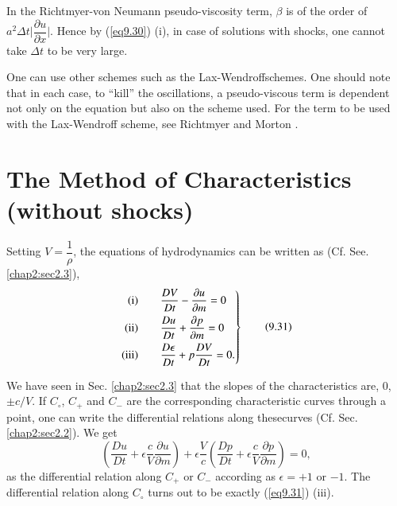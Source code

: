 \begin{remark}\label{chap9:rem9.4}
In the Richtmyer-von Neumann pseudo-viscosity term, $\beta$ is of the order of $a^2 \Delta t \Big|\dfrac{\partial u}{\partial x} \Big|$. Hence by (\ref{eq9.30}) (i), in case of solutions  
with shocks, one cannot take $\Delta t$ to be very large.
\end{remark}

\begin{remark}\label{chap9:rem9.5}
One can use other schemes such as the Lax-Wendroff\break  schemes. One should
note that in each case, to ``kill'' the oscillations, a pseudo-viscous
term is dependent not only on the equation but also on the scheme
used. For the term to be used with the Lax-Wendroff scheme, see
Richtmyer and Morton \cite{key32}.  
\end{remark}


\section{The Method of Characteristics (without
  shocks)}\label{chap9:sec9.7}

Setting $V = \dfrac{1}{\rho}$, the equations of hydrodynamics can be
written as (Cf. See. \ref{chap2:sec2.3}), 
\begin{equation*} 
\left. 
\begin{aligned}
{\rm (i)} & \qquad \frac{DV}{Dt} - \frac{\partial u}{\partial m} = 0\\
{\rm (ii)} & \qquad  \frac{Du}{Dt} + \frac{\partial p}{\partial m} = 0\\
{\rm (iii)} & \qquad  \frac{D\epsilon}{Dt} + p \frac{DV}{Dt} =0.
\end{aligned}
\right\}
\tag{9.31}\label{eq9.31}
\end{equation*}

We have seen in Sec. \ref{chap2:sec2.3} that the slopes of the
characteristics are, $0$, $\pm c/V$. If $C_\circ$, $C_+$ and $C_-$ are
the corresponding characteristic curves through a point, one can write
the differential relations along these\break curves
(Cf. Sec. \ref{chap2:sec2.2}). We get 
\begin{equation*}
\left(\frac{Du}{Dt} + \epsilon \frac{c}{V} \frac{\partial u}{\partial
  m}\right)  + \epsilon \frac{V}{c} \left(\frac{Dp}{Dt} + \epsilon
\frac{c}{V} \frac{\partial p}{\partial m}\right)  = 0,
\tag{9.32}\label{eq9.32}
\end{equation*}
as the differential relation along $C_+$ or $C_-$ according as $\epsilon = + 1$ or $-1$. The differential relation along $C_\circ$ turns out to be exactly (\ref{eq9.31}) (iii).

